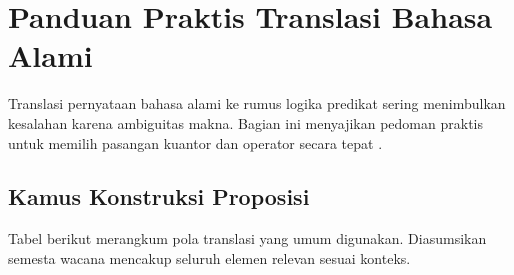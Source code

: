 \section{Panduan Praktis Translasi Bahasa Alami}

Translasi pernyataan bahasa alami ke rumus logika predikat sering menimbulkan kesalahan karena ambiguitas makna. Bagian ini menyajikan pedoman praktis untuk memilih pasangan kuantor dan operator secara tepat \cite{rosen2019}.

\subsection{Kamus Konstruksi Proposisi}

Tabel berikut merangkum pola translasi yang umum digunakan. Diasumsikan semesta wacana mencakup seluruh elemen relevan sesuai konteks.

